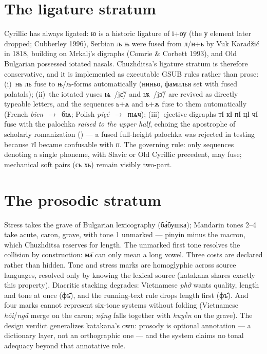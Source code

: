 \documentclass[12pt]{article}
\newcommand{\cz}[1]{{\chu #1}}
\newcommand{\ph}[1]{{\ipafont/#1/}}
\newcommand{\phon}[1]{{\ipafont[#1]}}
\begin{document}
\section{The ligature stratum}

Cyrillic has always ligated: \cz{ю} is a historic ligature of і+оу (the у element later dropped; Cubberley 1996), Serbian \cz{љ њ} were fused from л/н+ь by Vuk Karad\v{z}i\'c in 1818, building on Mrkalj's digraphs (Comrie \& Corbett 1993), and Old Bulgarian possessed iotated nasals. Chuzhditsa's ligature stratum is therefore conservative, and it is implemented as executable GSUB rules rather than prose: (i)~\cz{нь ль} fuse to њ/љ-forms automatically (\cz{ниньо}, \cz{фамилья} set with fused palatals); (ii)~the iotated yuses \cz{ѩ}~\ph{jɛ̃} and \cz{ѭ}~\ph{jɔ̃} are revived as directly typeable letters, and the sequences \cz{ь}+\cz{ѧ} and \cz{ь}+\cz{ѫ} fuse to them automatically (French \emph{bien}~$\rightarrow$~\cz{бѩ}; Polish \emph{pięć}~$\rightarrow$~\cz{пѩч}); (iii)~ejective digraphs \cz{тӀ кӀ пӀ цӀ чӀ} fuse with the palochka \emph{raised to the upper half}, echoing the apostrophe of scholarly romanization (\phon{tʼ kʼ}) — a fused full-height palochka was rejected in testing because \cz{тӀ} became confusable with \cz{п}. The governing rule: only sequences denoting a single phoneme, with Slavic or Old Cyrillic precedent, may fuse; mechanical soft pairs (\cz{сь хь}) remain visibly two-part.

\section{The prosodic stratum}

Stress takes the grave of Bulgarian lexicography (\cz{ба̀бушка}); Mandarin tones 2--4 take acute, caron, grave, with tone 1 unmarked — pinyin minus the macron, which Chuzhditsa reserves for length. The unmarked first tone resolves the collision by construction: \cz{ма̄} can only mean a long vowel. Three costs are declared rather than hidden. Tone and stress marks are homoglyphic across source languages, resolved only by knowing the lexical source (katakana shares exactly this property). Diacritic stacking degrades: Vietnamese \emph{phở} wants quality, length and tone at once (\cz{фъ̄̌}), and the running-text rule drops length first (\cz{фъ̌}). And four marks cannot represent six-tone systems without folding (Vietnamese \emph{hỏi}/\emph{ngã} merge on the caron; \emph{nặng} falls together with \emph{huyền} on the grave). The design verdict generalizes katakana's own: prosody is optional annotation — a dictionary layer, not an orthographic one — and the system claims no tonal adequacy beyond that annotative role.
\end{document}
